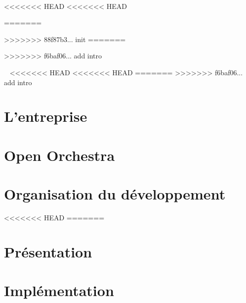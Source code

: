\documentclass[a4paper, 12pt]{report}
\begin{document}
\newcommand{\HRule}{\rule{\linewidth}{0.5mm}}



~
\thispagestyle{empty}

<<<<<<< HEAD
<<<<<<< HEAD
% 

=======
 

>>>>>>> 88f87b3... init
=======
% 

>>>>>>> f6baf06... add intro
\tableofcontents
\thispagestyle{empty}
\setcounter{page}{0}

\renewcommand{\arraystretch}{1.5}


~
\thispagestyle{empty}
\setcounter{page}{0}
\newpage
<<<<<<< HEAD
<<<<<<< HEAD
=======
>>>>>>> f6baf06... add intro

\part{L'entreprise}

\part{Open Orchestra}

\part{Organisation du développement}
<<<<<<< HEAD
=======

\part{Présentation}
    

    

    

\part{Implémentation}
    

    

    

    
\end{document}
